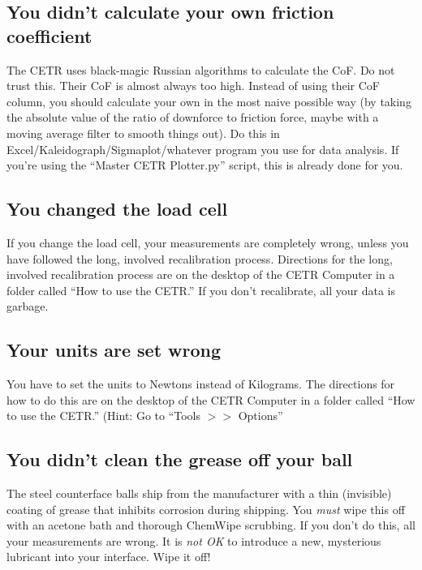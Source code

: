 \documentclass[10pt, letterpaper]{article}
\begin{document}
\subsection{You didn't calculate your own friction coefficient}
The CETR uses black-magic Russian algorithms to calculate the CoF. Do not trust this. Their CoF is almost always too high. Instead of using their CoF column, you should calculate your own in the most naive possible way (by taking the absolute value of the ratio of downforce to friction force, maybe with a moving average filter to smooth things out). Do this in Excel/Kaleidograph/Sigmaplot/whatever program you use for data analysis. If you're using the ``Master CETR Plotter.py'' script, this is already done for you.

\subsection{You changed the load cell}
If you change the load cell, your measurements are completely wrong, unless you have followed the long, involved recalibration process. Directions for the long, involved recalibration process are on the desktop of the CETR Computer in a folder called ``How to use the CETR.'' If you don't recalibrate, all your data is garbage.

\subsection{Your units are set wrong}
You have to set the units to Newtons instead of Kilograms. The directions for how to do this are on the desktop of the CETR Computer in a folder called ``How to use the CETR.'' (Hint: Go to ``Tools $>>$ Options''

\subsection{You didn't clean the grease off your ball}
The steel counterface balls ship from the manufacturer with a thin (invisible) coating of grease that inhibits corrosion during shipping. You \emph{must} wipe this off with an acetone bath and thorough ChemWipe scrubbing. If you don't do this, all your measurements are wrong. It is \emph{not OK} to introduce a new, mysterious lubricant into your interface. Wipe it off!
\end{document}
